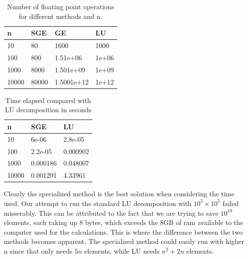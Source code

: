 \documentclass[a4paper,12pt]{article}
\begin{document}
\begin{table}[H]
\begin{center}
\begin{tabular}{ | l | l | l | l |}
    \hline
    n      & SGE & GE & LU\\ 
    \hline
    10     & 80 & 1600 & 1000\\  
    100    & 800 & 1.51e+06 & 1e+06\\
    1000   & 8000 & 1.501e+09 & 1e+09\\
    10000  &  80000 & 1.5001e+12 & 1e+12\\
    \hline
\end{tabular}
\caption{Number of floating point operations for different methods and n.}
\label{flops}
\end{center}
\end{table}

\begin{table}[H]
\begin{center}
\begin{tabular}{ | l | l | l |}
    \hline
    n      & SGE & LU\\ 
    \hline
    10     & 6e-06 & 2.8e-05\\  
    100    & 2.2e-05 & 0.000902\\
    1000   & 0.000186 & 0.048007\\
    10000  &  0.001291 & 4.33961\\
    \hline
\end{tabular}
\caption{Time elapsed compared with LU decomposition in seconds}
\end{center}
\end{table}

Clearly the specialized method is the best solution when considering the time used. Our attempt to run the standard LU decomposition with $10^5\times10^5 $ failed misserably. This can be attributed to the fact that we are trying to save $10^{10}$ elements, each taking up 8 bytes, which exceeds the 8GB of ram available to the computer used for the calculations. This is where the difference between the two methods becomes apparent. The specialized method could easily run with higher n since that only needs $5n$ elements, while LU needs $n^2 +2n$ elements.
\end{document}
